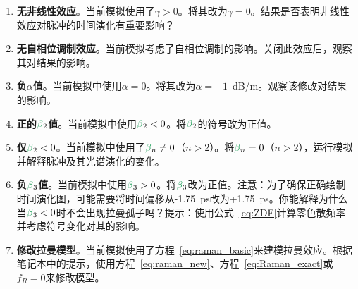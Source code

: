 \begin{enumerate}
\item \textbf{无非线性效应}。当前模拟使用了$\gamma>0$。将其改为$\gamma=0$。结果是否表明非线性效应对脉冲的时间演化有重要影响？

\item \textbf{无自相位调制效应}。当前模拟考虑了自相位调制的影响。关闭此效应后，观察其对结果的影响。

\item \textbf{负$\alpha$值}。当前模拟中使用$\alpha=0$。将其改为$\alpha=-1$~dB/m。观察该修改对结果的影响。

\item \textbf{正的$\betag_2$值}。当前模拟中使用$\betag_2<0$。将$\betag_2$的符号改为正值。

\item \textbf{仅$\betag_2<0$}。当前模拟中使用了$\betag_n\neq 0$（$n>2$）。将$\betag_n = 0$（$n>2$），运行模拟并解释脉冲及其光谱演化的变化。

\item \textbf{负$\betag_3$值}。当前模拟中使用$\betag_3>0$。将$\betag_3$改为正值。注意：为了确保正确绘制时间演化图，可能需要将时间偏移从-1.75~ps改为+1.75~ps。你能解释为什么当$\betag_3<0$时不会出现拉曼孤子吗？提示：使用公式~\ref{eq:ZDF}计算零色散频率并考虑符号变化对其的影响。

\item \textbf{修改拉曼模型}。当前模拟使用了方程~\ref{eq:raman_basic}来建模拉曼效应。根据笔记本中的提示，使用方程~\ref{eq:raman_new}、方程~\ref{eq:Raman_exact}或$f_R=0$来修改模型。
\end{enumerate}
